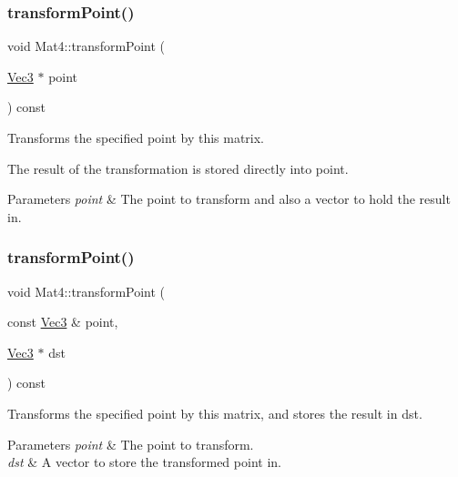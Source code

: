 \subsubsection{\texorpdfstring{transform\+Point()}{transformPoint()}\hspace{0.1cm}{\footnotesize\ttfamily [2/4]}}
{\footnotesize\ttfamily void Mat4\+::transform\+Point (\begin{DoxyParamCaption}\item[{\hyperlink{classVec3}{Vec3} $\ast$}]{point }\end{DoxyParamCaption}) const\hspace{0.3cm}{\ttfamily [inline]}}

Transforms the specified point by this matrix.

The result of the transformation is stored directly into point.


\begin{DoxyParams}{Parameters}
{\em point} & The point to transform and also a vector to hold the result in. \\
\hline
\end{DoxyParams}
\mbox{\label{classMat4_af85f1c69ea4ca7632d541fb12d3b23a5}} 
\subsubsection{\texorpdfstring{transform\+Point()}{transformPoint()}\hspace{0.1cm}{\footnotesize\ttfamily [3/4]}}
{\footnotesize\ttfamily void Mat4\+::transform\+Point (\begin{DoxyParamCaption}\item[{const \hyperlink{classVec3}{Vec3} \&}]{point,  }\item[{\hyperlink{classVec3}{Vec3} $\ast$}]{dst }\end{DoxyParamCaption}) const\hspace{0.3cm}{\ttfamily [inline]}}

Transforms the specified point by this matrix, and stores the result in dst.


\begin{DoxyParams}{Parameters}
{\em point} & The point to transform. \\
\hline
{\em dst} & A vector to store the transformed point in. \\
\hline
\end{DoxyParams}
\mbox{\label{classMat4_af85f1c69ea4ca7632d541fb12d3b23a5}} 
